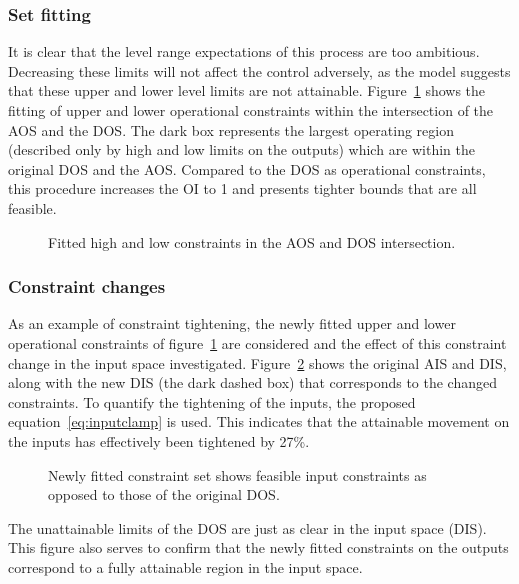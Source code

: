\subsubsection{Set fitting}
It is clear that the level range expectations of this process are too ambitious.
Decreasing these limits will not affect the control adversely, as the model suggests that these upper and lower level limits are not attainable.
Figure~\ref{fig:flowfitbox} shows the fitting of upper and lower operational constraints within the intersection of the AOS and the DOS.
The dark box represents the largest operating region (described only by high and low limits on the outputs) which are within the original DOS and the AOS.
Compared to the DOS as operational constraints, this procedure increases the OI to 1 and presents tighter bounds that are all feasible.

\begin{figure}[htbp]
  \centering
    \scalebox{1}{}  
  \caption{Fitted high and low constraints in the AOS and DOS intersection.}
  \label{fig:flowfitbox}
\end{figure}

\subsubsection{Constraint changes}
As an example of constraint tightening, the newly fitted upper and lower operational constraints of figure~\ref{fig:flowfitbox} are considered and the effect of this constraint change in the input space investigated.
Figure~\ref{fig:flowconsinput} shows the original AIS and DIS, along with the new DIS (the dark dashed box) that corresponds to the changed constraints.
To quantify the tightening of the inputs, the proposed equation~\ref{eq:inputclamp} is used.
This indicates that the attainable movement on the inputs has effectively been tightened by 27\%. 

\begin{figure}[htbp]
  \centering
    \scalebox{1}{}  
  \caption[AIS, DIS and newly fitted DIS of level and flow rig]{Newly fitted constraint set shows feasible input constraints as opposed to those of the original DOS.}
  \label{fig:flowconsinput}
\end{figure}

The unattainable limits of the DOS are just as clear in the input space (DIS).
This figure also serves to confirm that the newly fitted constraints on the outputs correspond to a fully attainable region in the input space.

